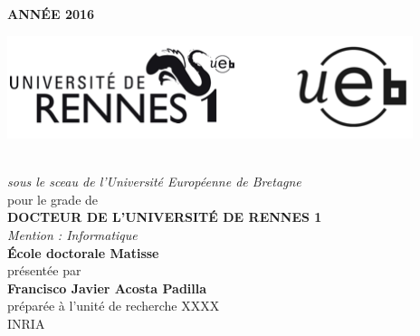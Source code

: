 {\selectfont
\thispagestyle{empty}
\begin{minipage}{\textwidth}
\vspace{-7cm}
\hfill
\textbf{ANN\'EE 2016}
\end{minipage}

\vspace{-3.5cm}\hspace{-2cm}
 	\center
\includegraphics[height=30mm]{Logos.png} 

\vspace{.7cm}
\begin{center}
\begin{minipage}{\textwidth}
\\ \vspace{0mm}\emph{\large sous le sceau de l'Universit\'e Europ\'eenne de Bretagne}\\
\vspace{0.5cm}
{\large pour le grade de}\\ \vspace{2mm}
{\Large\bfseries  DOCTEUR DE L'UNIVERSIT\'E DE RENNES 1}\\ \vspace{0.4cm}
\emph{\large Mention : Informatique}\\ \vspace{2mm}
{\Large\bfseries  \'Ecole doctorale Matisse}\\ \vspace{0.5cm}
{\large pr\'esent\'ee par} \\ \vspace{3mm}
{\Huge\bfseries Francisco Javier Acosta Padilla}\\ \vspace{0.6cm}
{\large pr\'epar\'ee \`a l'unit\'e de recherche XXXX\\}
{\large\vspace{0.00cm}INRIA\\}
\end{minipage}
\vspace{0.3cm}


\end{center}}
